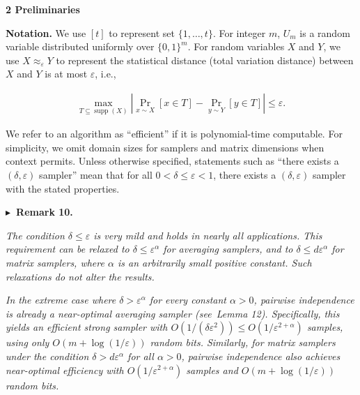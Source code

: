 





\par\medskip\noindent\textbf{
2 Preliminaries}\par




\textbf{Notation.} We use $[t]$ to represent set $\{1,\dots,t\}$. For integer $m$, $U_{m}$ is a random variable distributed uniformly over $\{0,1\}^{m}$. For random variables $X$ and $Y$, we use $X\approx_{\varepsilon}Y$ to represent the statistical distance (total variation distance) between $X$ and $Y$ is at most $\varepsilon$, i.e.,\par


\[\begin{gathered}
\max_{T\subseteq\operatorname*{supp}(X)}\left|\Pr_{x\sim X}[x\in T]-\Pr_{y\sim
Y}[y\in T]\right|\leq\varepsilon.
\end{gathered}\]




We refer to an algorithm as “efficient” if it is polynomial-time computable.
For simplicity, we omit domain sizes for samplers and matrix dimensions when context permits. Unless otherwise specified, statements such as “there exists a $(\delta,\varepsilon)$ sampler” mean that for all $0<\delta\leq\varepsilon<1$, there exists a $(\delta,\varepsilon)$ sampler with the stated properties.\par





\par\medskip\noindent\textbf{
$\blacktriangleright$ Remark 10.
}\par



\emph{The condition $\delta\leq\varepsilon$ is very mild and holds in nearly all applications.
This requirement can be relaxed to $\delta\leq\varepsilon^{\alpha}$ for averaging samplers, and to $\delta\leq d\varepsilon^{\alpha}$ for matrix samplers, where $\alpha$ is an arbitrarily small positive constant. Such relaxations do not alter the results.}\par




\emph{In the extreme case where $\delta>\varepsilon^{\alpha}$ for every constant $\alpha>0$, pairwise independence is already a near-optimal averaging sampler (see Lemma 12). Specifically, this yields an efficient strong sampler with $O(1/(\delta\varepsilon^{2}))\leq O(1/\varepsilon^{2+\alpha})$ samples, using only $O(m+\log(1/\varepsilon))$ random bits.
Similarly, for matrix samplers under the condition $\delta>d\varepsilon^{\alpha}$ for all $\alpha>0$, pairwise independence also achieves near-optimal efficiency with $O(1/\varepsilon^{2+\alpha})$ samples and $O(m+\log(1/\varepsilon))$ random bits.}\par



